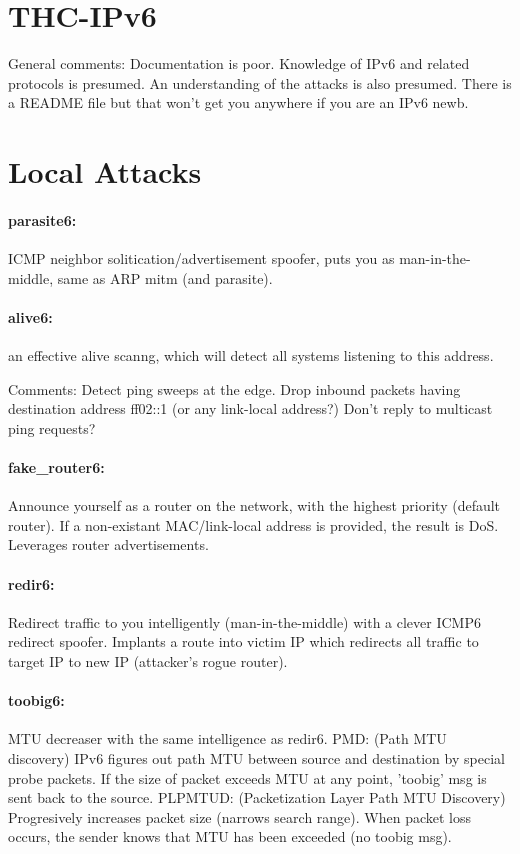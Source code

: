 \documentclass{article}
\begin{document}
\section{THC-IPv6}	
\label{thc}
General comments: Documentation is poor. Knowledge of IPv6 and related protocols is presumed. An understanding of the attacks is also presumed. There is a README file but that won't get you anywhere if you are an IPv6 newb.

\section{Local Attacks}	
\paragraph*{parasite6:} ICMP neighbor solitication/advertisement spoofer, puts you
   as man-in-the-middle, same as ARP mitm (and parasite).

\paragraph*{alive6:} an effective alive scanng, which will detect all systems
   listening to this address.

   Comments: Detect ping sweeps at the edge. Drop inbound packets having destination address ff02::1 (or any link-local address?) Don't reply to multicast ping requests?

\paragraph*{fake\_router6:} Announce yourself as a router on the network, with the
   highest priority (default router). If a non-existant MAC/link-local address is provided, the result is DoS. Leverages router advertisements.

\paragraph*{redir6:} Redirect traffic to you intelligently (man-in-the-middle) with
   a clever ICMP6 redirect spoofer. Implants a route into victim IP which redirects all traffic to target IP to new IP (attacker's rogue router).

\paragraph*{toobig6:} MTU decreaser with the same intelligence as redir6. 
PMD: (Path MTU discovery) IPv6 figures out path MTU between source and destination by special probe packets. If the size of packet exceeds MTU at any point, 'toobig' msg is sent back to the source. 
PLPMTUD: (Packetization Layer Path MTU Discovery) Progresively increases packet size (narrows search range). When packet loss occurs, the sender knows that MTU has been exceeded (no toobig msg).
\end{document}
